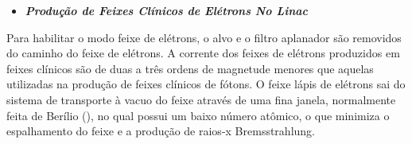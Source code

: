 \documentclass[11pt,a4paper]{article}
\begin{document}
                \begin{itemize}
                    \item \textbf{\textit{\textcolor{CarnationPink}{Produção de Feixes Clínicos de Elétrons No Linac}}}
                \end{itemize}

	Para habilitar o modo feixe de elétrons, o alvo e o filtro aplanador são removidos do caminho do feixe de elétrons. A corrente dos feixes de elétrons produzidos em feixes clínicos são de duas a três ordens de magnetude menores que aquelas utilizadas na produção de feixes clínicos de fótons. O feixe lápis de elétrons sai do sistema de transporte à vacuo do feixe através de uma fina janela, normalmente feita de Berílio (), no qual possui um baixo número atômico, o que minimiza o espalhamento do feixe e a produção de raios-x Bremsstrahlung.
\end{document}
